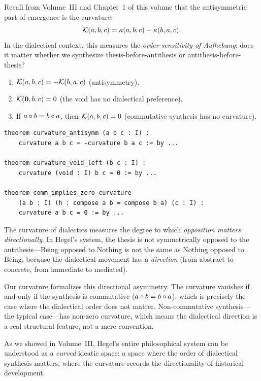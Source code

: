 Recall from Volume~III and Chapter~1 of this volume that the antisymmetric part
of emergence is the curvature:
\[
  \mathcal{K}(a, b, c) = \kappa(a, b, c) - \kappa(b, a, c).
\]
In the dialectical context, this measures the \emph{order-sensitivity of
Aufhebung}: does it matter whether we synthesize thesis-before-antithesis or
antithesis-before-thesis?

\begin{theorem}
\label{thm:dialectical-curvature}
\begin{enumerate}
  \item $\mathcal{K}(a, b, c) = -\mathcal{K}(b, a, c)$ (antisymmetry).
  \item $\mathcal{K}(\mathbf{0}, b, c) = 0$ (the void has no dialectical preference).
  \item If $a \circ b = b \circ a$, then $\mathcal{K}(a, b, c) = 0$ (commutative
    synthesis has no curvature).
\end{enumerate}
\end{theorem}

\begin{lstlisting}[caption={Curvature in dialectics (IDT\_v3\_Emergence.lean)}]
theorem curvature_antisymm (a b c : I) :
    curvature a b c = -curvature b a c := by ...

theorem curvature_void_left (b c : I) :
    curvature (void : I) b c = 0 := by ...

theorem comm_implies_zero_curvature
    (a b : I) (h : compose a b = compose b a) (c : I) :
    curvature a b c = 0 := by ...
\end{lstlisting}

\begin{interpretation}
The curvature of dialectics measures the degree to which \emph{opposition matters
directionally}. In Hegel's system, the thesis is not symmetrically opposed to the
antithesis---Being opposed to Nothing is not the same as Nothing opposed to Being,
because the dialectical movement has a \emph{direction} (from abstract to concrete,
from immediate to mediated).

Our curvature formalizes this directional asymmetry. The curvature vanishes if and
only if the synthesis is commutative ($a \circ b = b \circ a$), which is
precisely the case where the dialectical order does not matter. Non-commutative
synthesis---the typical case---has non-zero curvature, which means the dialectical
direction is a real structural feature, not a mere convention.

As we showed in Volume~III, Hegel's entire philosophical system can be understood
as a \emph{curved} ideatic space: a space where the order of dialectical synthesis
matters, where the curvature records the directionality of historical development.
\end{interpretation}


